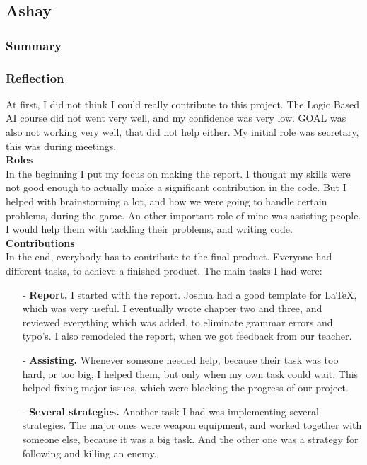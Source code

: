 \newpage
\subsection{Ashay}
\subsubsection{Summary}
\subsubsection{Reflection}
At first, I did not think I could really contribute to this project. The Logic Based AI course did not went very well, and my confidence was very low. GOAL was also not working very well, that did not help either. My initial role was secretary, this was during meetings. \\
\noindent
\textbf{Roles}\\
In the beginning I put my focus on making the report. I thought my skills were not good enough to actually make a significant contribution in the code. But I helped with brainstorming a lot, and how we were going to handle certain problems, during the game. An other important role of mine was assisting people. I would help them with tackling their problems, and writing code.\\
\noindent
\textbf{Contributions}\\
In the end, everybody has to contribute to the final product. Everyone had different tasks, to achieve a finished product. The main tasks I had were:
\begin{itemize}
	\item[-] \textbf{Report.} I started with the report. Joshua had a good template for LaTeX, which was very useful. I eventually wrote chapter two and three, and reviewed everything which was added, to eliminate grammar errors and typo's. I also remodeled the report, when we got feedback from our teacher.
	\item[-] \textbf{Assisting.} Whenever someone needed help, because their task was too hard, or too big, I helped them, but only when my own task could wait. This helped fixing major issues, which were blocking the progress of our project.
	\item[-] \textbf{Several strategies.} Another task I had was implementing several strategies. The major ones were weapon equipment, and worked together with someone else, because it was a big task. And the other one was a strategy for following and killing an enemy.
\end{itemize} 